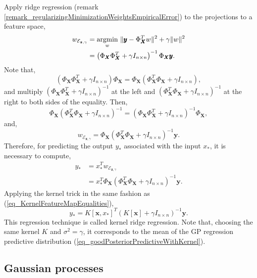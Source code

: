 \begin{remark} 
  Apply ridge regression (remark \ref{remark_regularizingMinimizationWeightsEmpiricalError}) to the projections to a feature space,
$$
 \begin{aligned}
  w_{\mathcal{E}_{\pmb{z},\gamma}} 
   &= \underset{w}{\textup{argmin}} \ \| \pmb{y} - \Phi_{\pmb{X}}^T w \|^2 + \gamma \|w\|^2 \\ 
   &= \left( \Phi_{\pmb{X}}\Phi_{\pmb{X}}^T + \gamma I_{n \times n} \right)^{-1}\Phi_{\pmb{X}}\pmb{y}.
 \end{aligned}
$$
Note that,
$$
  \left( \Phi_{\pmb{X}}\Phi_{\pmb{X}}^T + \gamma I_{n \times n} \right)\Phi_{\pmb{X}}
  =
  \Phi_{\pmb{X}} \left( \Phi_{\pmb{X}}^T\Phi_{\pmb{X}} + \gamma I_{n \times n} \right),
$$
and multiply $\left( \Phi_{\pmb{X}}\Phi_{\pmb{X}}^T + \gamma I_{n \times n} \right)^{-1}$ at the left and $\left( \Phi_{\pmb{X}}^T\Phi_{\pmb{X}} + \gamma I_{n \times n} \right)^{-1}$ at the right to both sides of the equality. Then,
$$
  \Phi_{\pmb{X}} \left( \Phi_{\pmb{X}}^T\Phi_{\pmb{X}} + \gamma I_{n \times n} \right)^{-1}
  = 
  \left( \Phi_{\pmb{X}}\Phi_{\pmb{X}}^T + \gamma I_{n \times n} \right)^{-1} \Phi_{\pmb{X}},
$$
and,
$$
  w_{\mathcal{E}_{\pmb{z},\gamma}}
  =
  \Phi_{\pmb{X}} \left( \Phi_{\pmb{X}}^T\Phi_{\pmb{X}} + \gamma I_{n \times n} \right)^{-1} \pmb{y}.
$$
Therefore, for predicting the output $y_*$ associated with the input $x_*$, it is necessary to compute,
$$
 \begin{aligned}
  y_* &= x_*^T w_{\mathcal{E}_{\pmb{z},\gamma}}  \\
      &= x_*^T \Phi_{\pmb{X}} \left( \Phi_{\pmb{X}}^T\Phi_{\pmb{X}} + \gamma I_{n \times n} \right)^{-1} \pmb{y}.
 \end{aligned}
$$
Applying the kernel trick in the same fashion as (\ref{eq_KernelFeatureMapEqualities}),
$$
  y_* = K[\pmb{x},x_*]^T \left( K[\pmb{x}] + \gamma I_{n \times n} \right)^{-1} \pmb{y}. 
$$
This regression technique is called kernel ridge regression. Note that, choosing the same kernel $K$ and $\sigma^2 = \gamma$, it corresponds to the mean of the GP regression predictive distribution (\ref{eq_goodPosteriorPredictiveWithKernel}).
\end{remark}


\subsection{Gaussian processes}

